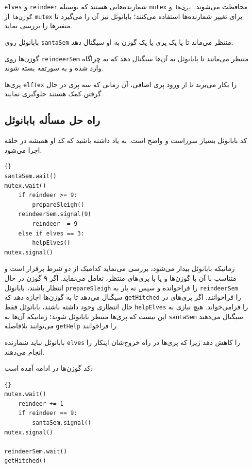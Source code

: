 \documentclass{book}
\newcommand{\clearemptydoublepage}{\newpage\cleardoublepage}
\begin{document}
    {\tt elves} و {\tt reindeer} شمارنده‌هایی هستند که بوسیله {\tt mutex} محافظت می‌شوند. 
    {\tt پری‌ها} و {\tt گوزن‌‌ها} از {\tt mutex} برای تغییر شمارنده‌ها استفاده می‌کنند؛‌ بابانوئل نیز آن را می‌گیرد تا متغیرها را بررسی نماید.

    بابانوئل روی  {\tt santaSem} منتظر می‌ماند تا یا یک پری یا یک گوزن به او سیگنال دهد. 

    گوزن‌ها روی {\tt reindeerSem} منتظر می‌مانند تا بابانوئل به آن‌ها سیگنال دهد که به چراگاه وارد شده و به سورتمه بسته شوند. 

    پری‌ها {\tt elfTex} را بکار می‌برند تا از ورود پری اضافی، آن زمانی که سه پری در حال گرفتن کمک هستند جلوگیری نمایند. 


\clearemptydoublepage
\subsection{راه حل مسأله بابانوئل}

    کد بابانوئل بسیار سرراست و واضح است. به یاد داشته باشید که کد او همیشه در حلقه اجرا می‌شود. 

\begin{latin}
\begin{lstlisting}[title=\rl{راه حل مسأله بابانوئل (بابانوئل)}]{}
santaSem.wait()
mutex.wait()
    if reindeer >= 9:
        prepareSleigh()
	reindeerSem.signal(9)
        reindeer -= 9
    else if elves == 3:
        helpElves()
mutex.signal()
\end{lstlisting}
\end{latin}

    زمانیکه بابانوئل بیدار می‌شود، بررسی می‌نماید کدامیک از دو شرط برقرار است و متناسب با آن با گوزن‌ها  و یا با پری‌های منتظر، تعامل می‌نماید. 
    اگر ۹ گوزن در حال انتظار باشند، بابانوئل  {\tt prepareSleigh} را فراخوانده و سپس نه بار به {\tt reindeerSem} سیگنال می‌دهد تا به گوزن‌ها
    اجازه دهد که {\tt getHitched} را فراخوانند. اگر پری‌های در حال انتظاری وجود داشته باشند، بابانوئل فقط {\tt helpElves} را فرامی‌خواند. 
    هیچ نیازی به این نیست که پری‌ها منتظر بابانوئل شوند؛ زمانیکه آن‌ها به {\tt santaSem} سیگنال می‌دهند می‌توانند بلافاصله  {\tt getHelp}  را فراخوانند. 

    بابانوئل نباید شمارنده {\tt elves} را کاهش دهد زیرا که پری‌ها در راه خروج‌شان اینکار را انجام می‌دهند. 

    کد گوزن‌ها در ادامه آمده است: 

\begin{latin}
\begin{lstlisting}[title=\rl{راه حل مسأله بابانوئل (گوزن‌ها)}]{}
mutex.wait()
    reindeer += 1
    if reindeer == 9:
        santaSem.signal()
mutex.signal()

reindeerSem.wait()
getHitched()
\end{lstlisting}
\end{latin}
\end{document}
